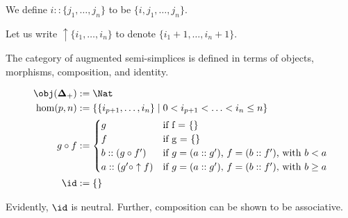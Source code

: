 \documentclass[10pt]{art.cls/art}
\newcommand{\DeltaPlus}{\ensuremath{\boldsymbol{\Delta}_+}}
\begin{document}
\begin{notation}[::]
  We define $i :: \{j_1, \ldots, j_n\}$ to be $\{i, j_1, \ldots, j_n\}$.
\end{notation}

\begin{notation}[$\uparrow$]
  Let us write $\uparrow \{i_1, \ldots, i_n\}$ to denote $\{i_1 + 1, \ldots, i_n + 1\}$.
\end{notation}

\begin{definition}[\DeltaPlus]
  The category of augmented semi-simplices is defined in terms of objects, morphisms, composition, and identity.

  \begin{align*}
    \obj(\DeltaPlus) & := \Nat                                                                    \\
    \hom(p, n)       & := \{\{i_{p + 1}, \ldots, i_n\} \mid 0 < i_{p + 1} < \ldots < i_n \leq n\} \\
    g \circ f        & :=
    \begin{cases}
      g                          & \text{if f = \{\}}                                          \\
      f                          & \text{if g = \{\}}                                          \\
      b :: (g \circ f')          & \text{if $g = (a :: g')$, $f = (b :: f')$, with $b < a$}    \\
      a :: (g' \circ \uparrow f) & \text{if $g = (a :: g')$, $f = (b :: f')$, with $b \geq a$} \\
    \end{cases}      \\
    \id              & := \{\}
  \end{align*}

  Evidently, $\id$ is neutral. Further, composition can be shown to be associative.
\end{definition}
\end{document}
